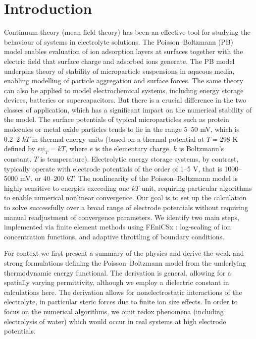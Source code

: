 \section*{Introduction}

Continuum theory (mean field theory) has been an effective tool for
studying the behaviour of systems in electrolyte solutions. The
Poisson--Boltzmann (PB) model \citep{Wu2022} enables evaluation of ion
adsorption layers at surfaces together with the electric field that
surface charge and adsorbed ions generate. The PB model underpins
theory of stability of microparticle suspensions in aqueous media,
enabling modelling of particle aggregation and surface forces. The
same theory can also be applied to model electrochemical
systems, including energy storage devices, batteries or
supercapacitors. But there is a crucial difference in the two classes
of application, which has a significant impact on the numerical
stability of the model.  The surface potentials
of typical microparticles such as protein molecules or metal oxide
particles tends to lie in the range 5--50 mV, which is 0.2--2
$kT$ in thermal energy units (based on a thermal potential at $T=298$
K defined by $e\psi_{T} = kT$, where $e$ is the elementary charge, $k$
is Boltzmann's constant, $T$ is temperature). Electrolytic energy
storage systems, by contrast, typically operate with electrode
potentials of the order of 1--5 V, that is 1000--5000 mV, or 40--200
$kT$.  The nonlinearity of the Poisson--Boltzmann model is highly
sensitive to energies exceeding one $kT$ unit, requiring particular
algorithms to enable numerical nonlinear convergence.  Our goal is to
set up the calculation to solve successfully over a broad range of
electrode potentials without requiring manual readjustment of
convergence parameters.  We identify two main steps, implemented via
finite element methods using FEniCSx \citep{baratta2023dolfinx}: log-scaling of
ion concentration functions, and adaptive throttling of boundary
conditions.

For context we first present a summary of the physics and
derive the
weak and strong formulations defining the Poisson--Boltzmann model from
the underlying thermodynamic energy functional. The derivation
is general, allowing for a spatially varying permittivity, although we
employ a dielectric constant in calculations here. The derivation
allows for nonelectrostatic interactions of the electrolyte, in
particular steric forces due to finite ion size effects.  
In order to focus on the numerical algorithms, we omit redox
phenomena (including electrolysis of water) which would occur in real
systems at  high electrode potentials.

